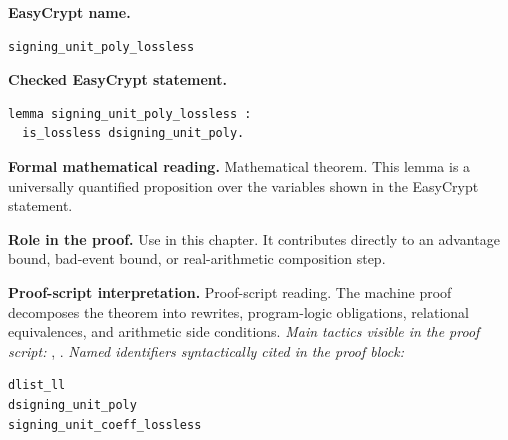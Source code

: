 \begin{formaltheorem}
\noindent\textbf{EasyCrypt name.}
\begin{lstlisting}[language=EasyCrypt,basicstyle=\ttfamily\scriptsize]
signing_unit_poly_lossless
\end{lstlisting}
\noindent\textbf{Checked EasyCrypt statement.}
\begin{lstlisting}[language=EasyCrypt,basicstyle=\ttfamily\scriptsize]
lemma signing_unit_poly_lossless :
  is_lossless dsigning_unit_poly.
\end{lstlisting}
\noindent\textbf{Formal mathematical reading.}
Mathematical theorem. This lemma is a universally quantified proposition over the variables shown in the EasyCrypt statement.

\noindent\textbf{Role in the proof.}
Use in this chapter. It contributes directly to an advantage bound, bad-event bound, or real-arithmetic composition step.

\noindent\textbf{Proof-script interpretation.}
Proof-script reading. The machine proof decomposes the theorem into rewrites, program-logic obligations, relational equivalences, and arithmetic side conditions.
\emph{Main tactics visible in the proof script:} , .
\emph{Named identifiers syntactically cited in the proof block:}
\begin{lstlisting}[language=EasyCrypt,basicstyle=\ttfamily\scriptsize]
dlist_ll
dsigning_unit_poly
signing_unit_coeff_lossless
\end{lstlisting}

\end{formaltheorem}

